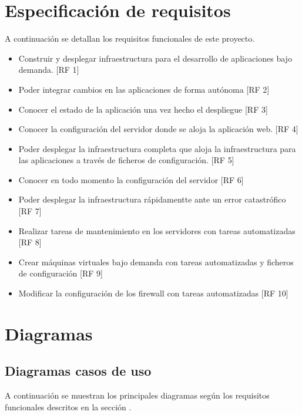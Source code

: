 \section{Especificación de requisitos}
	\label{erf}
	\begin{paragraph}
		A continuación se detallan los requisitos funcionales de este proyecto. 
		\begin{itemize}
			\item Construir y desplegar infraestructura para el desarrollo de aplicaciones bajo demanda. [RF 1]
			\item Poder integrar cambios en las aplicaciones de forma autónoma [RF 2]
			\item Conocer el estado de la aplicación una vez hecho el despliegue [RF 3]
			\item Conocer la configuración del servidor donde se aloja la aplicación web. [RF 4]
			\item Poder desplegar la infraestructura completa que aloja la infraestructura para las aplicaciones a través de ficheros de configuración. [RF 5]
			\item Conocer en todo momento la configuración del servidor [RF 6]
			\item Poder desplegar la infraestructura rápidamentte ante un error catastrófico [RF 7]
			\item Realizar tareas de mantenimiento en los servidores con tareas automatizadas [RF 8]
			\item Crear máquinas virtuales bajo demanda con tareas automatizadas y ficheros de configuración [RF 9]
			\item Modificar la configuración de los firewall con tareas automatizadas [RF 10]
		\end{itemize}
	\end{paragraph}

\section{Diagramas}
	\subsection{Diagramas casos de uso}
		\begin{paragraph}
			A continuación se muestran los principales diagramas según los requisitos funcionales descritos en la sección .
		\end{paragraph}
	
